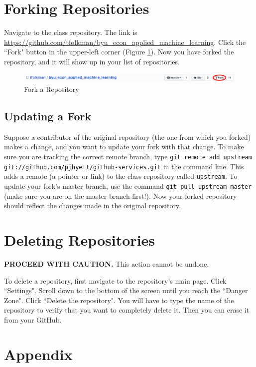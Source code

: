 \documentclass[11pt,a4paper]{article}
\begin{document}
\section{Forking Repositories}
Navigate to the class repository. 
The link is \url{https://github.com/tfolkman/byu_econ_applied_machine_learning}.
Click the ``Fork" button in the upper-left corner (Figure \ref{fig:fork}).
Now you have forked the repository, and it will show up in your list of repositories.

\begin{figure}[h!]
\centering
\includegraphics[width=.7\textwidth]{figures/fork.png}
\caption{Fork a Repository}
\label{fig:fork}
\end{figure}

\subsection{Updating a Fork}

Suppose a contributor of the original repository (the one from which you forked) makes a change, and you want to update your fork with that change.
To make sure you are tracking the correct remote branch, type \texttt{git remote add upstream git://github.com/pjhyett/github-services.git} in the command line.
This adds a remote (a pointer or link) to the class repository called \texttt{upstream}.
To update your fork's master branch, use the command \texttt{git pull upstream master} (make sure you are on the master branch first!).
Now your forked repository should reflect the changes made in the original repository.

\section{Deleting Repositories}
\textbf{PROCEED WITH CAUTION.}
This action cannot be undone.

To delete a repository, first navigate to the repository's main page.
Click ``Settings".
Scroll down to the bottom of the screen until you reach the ``Danger Zone".
Click ``Delete the repository".
You will have to type the name of the repository to verify that you want to completely delete it.
Then you can erase it from your GitHub.

\section{Appendix}
\end{document}
